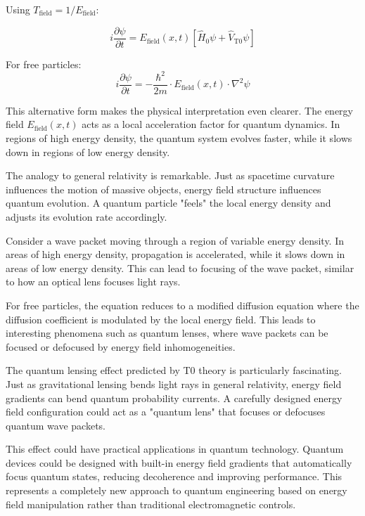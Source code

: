 \documentclass[12pt,a4paper]{article}
\theoremstyle{definition}
\theoremstyle{remark}
\begin{document}
Using $T_{\text{field}} = 1/E_{\text{field}}$:

\begin{equation}
	\boxed{i \frac{\partial\psi}{\partial t} = E_{\text{field}}(x,t) \left[\hat{H}_0 \psi + \hat{V}_{\text{T0}} \psi\right]}
	\label{eq:t0_schrodinger_energy}
\end{equation}

For free particles:
\begin{equation}
	\boxed{i \frac{\partial\psi}{\partial t} = -\frac{\hbar^2}{2m} \cdot E_{\text{field}}(x,t) \cdot \nabla^2 \psi}
	\label{eq:t0_schrodinger_free}
\end{equation}

This alternative form makes the physical interpretation even clearer. The energy field $E_{\text{field}}(x,t)$ acts as a local acceleration factor for quantum dynamics. In regions of high energy density, the quantum system evolves faster, while it slows down in regions of low energy density.

The analogy to general relativity is remarkable. Just as spacetime curvature influences the motion of massive objects, energy field structure influences quantum evolution. A quantum particle "feels" the local energy density and adjusts its evolution rate accordingly.

Consider a wave packet moving through a region of variable energy density. In areas of high energy density, propagation is accelerated, while it slows down in areas of low energy density. This can lead to focusing of the wave packet, similar to how an optical lens focuses light rays.

For free particles, the equation reduces to a modified diffusion equation where the diffusion coefficient is modulated by the local energy field. This leads to interesting phenomena such as quantum lenses, where wave packets can be focused or defocused by energy field inhomogeneities.

The quantum lensing effect predicted by T0 theory is particularly fascinating. Just as gravitational lensing bends light rays in general relativity, energy field gradients can bend quantum probability currents. A carefully designed energy field configuration could act as a "quantum lens" that focuses or defocuses quantum wave packets.

This effect could have practical applications in quantum technology. Quantum devices could be designed with built-in energy field gradients that automatically focus quantum states, reducing decoherence and improving performance. This represents a completely new approach to quantum engineering based on energy field manipulation rather than traditional electromagnetic controls.
\end{document}
